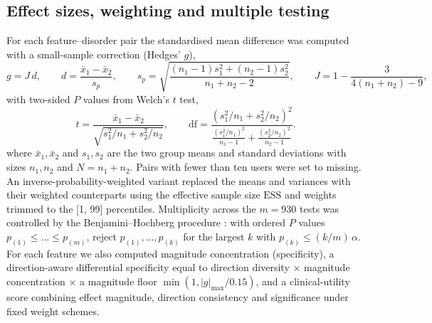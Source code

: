 \documentclass[11pt]{article}
\begin{document}
\subsection*{Effect sizes, weighting and multiple testing}
For each feature--disorder pair the standardised mean difference was computed with a
small-sample correction (Hedges' $g$),
\begin{equation}
g=J\,d,\qquad d=\frac{\bar{x}_{1}-\bar{x}_{2}}{s_{p}},\qquad
s_{p}=\sqrt{\frac{(n_{1}-1)s_{1}^{2}+(n_{2}-1)s_{2}^{2}}{n_{1}+n_{2}-2}},\qquad
J=1-\frac{3}{4(n_{1}+n_{2})-9},
\label{eq:hedges}
\end{equation}
with two-sided $P$ values from Welch's $t$ test,
\begin{equation}
t=\frac{\bar{x}_{1}-\bar{x}_{2}}{\sqrt{s_{1}^{2}/n_{1}+s_{2}^{2}/n_{2}}},\qquad
\mathrm{df}=\frac{(s_{1}^{2}/n_{1}+s_{2}^{2}/n_{2})^{2}}{\frac{(s_{1}^{2}/n_{1})^{2}}{n_{1}-1}+\frac{(s_{2}^{2}/n_{2})^{2}}{n_{2}-1}}.
\label{eq:welch}
\end{equation}
where $\bar x_{1},\bar x_{2}$ and $s_{1},s_{2}$ are the two group means and standard deviations
with sizes $n_{1},n_{2}$ and $N=n_{1}+n_{2}$. Pairs with fewer than ten users were set to missing. An inverse-probability-weighted variant
replaced the means and variances with their weighted counterparts using the effective sample
size $\mathrm{ESS}$ and weights trimmed to the [1, 99] percentiles. Multiplicity across the
$m=930$ tests was controlled by the Benjamini--Hochberg procedure \cite{benjamini1995controlling}:
with ordered $P$ values $p_{(1)}\le\dots\le p_{(m)}$, reject $p_{(1)},\dots,p_{(k)}$ for the
largest $k$ with $p_{(k)}\le (k/m)\,\alpha$. For each feature we also computed magnitude
concentration (specificity), a direction-aware differential specificity equal to direction
diversity $\times$ magnitude concentration $\times$ a magnitude floor
$\min(1,|g|_{\max}/0.15)$, and a clinical-utility score combining effect magnitude, direction
consistency and significance under fixed weight schemes.
\end{document}
